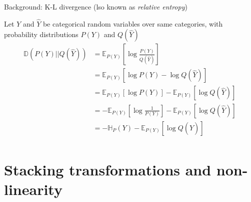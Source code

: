 \documentclass[12pt,aspectratio=169,handout]{beamer}
\begin{document}
\begin{frame}{Background: K-L divergence (lso known as \emph{relative entropy})}
	
Let $Y$ and $\hat{Y}$ be categorical random variables over same categories, with probability distributions $P(Y)$ and $Q(\hat{Y})$
\begin{align*}
	\mathbb{D}(P(Y) || Q(\hat{Y})) &= \mathbb{E}_{P(Y)} \left[ \log \frac{P(Y)}{Q(\hat{Y})} \right] \\
	&= \mathbb{E}_{P(Y)} \left[ \log P(Y) - \log Q(\hat{Y}) \right] \\
	&= \mathbb{E}_{P(Y)} \left[ \log P(Y)\right] - \mathbb{E}_{P(Y)} \left[ \log Q(\hat{Y}) \right] \\
	&= - \mathbb{E}_{P(Y)} \left[ \log \frac{1}{P(Y)}\right] - \mathbb{E}_{P(Y)} \left[ \log Q(\hat{Y}) \right] \\
	&= - \mathbb{H}_{P} (Y)  - \mathbb{E}_{P(Y)} \left[ \log Q(\hat{Y}) \right] \\
\end{align*}
	
\end{frame}



\section{Stacking transformations and non-linearity}
\end{document}
